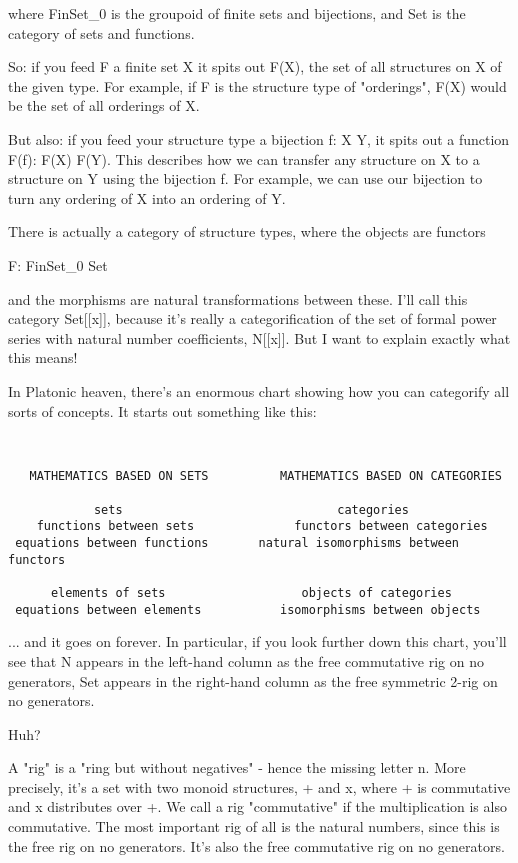 where FinSet_{0} is the groupoid of finite sets and bijections,
and Set is the category of sets and functions.

So: if you feed F a finite set X it spits out F(X), the set of 
all structures on X of the given type.  For example, if F is the
structure type of "orderings", F(X) would be the set of all 
orderings of X.

But also: if you feed your structure type a bijection f: X \to  Y,
it spits out a function F(f): F(X) \to  F(Y).  This describes how
we can transfer any structure on X to a structure on Y using the
bijection f.  For example, we can use our bijection to turn any 
ordering of X into an ordering of Y.

There is actually a category of structure types, where the objects 
are functors 

F: FinSet_{0} \to  Set

and the morphisms are natural transformations between these.   I'll 
call this category Set[[x]], because it's really a categorification of 
the set of formal power series with natural number coefficients, N[[x]]. 
But I want to explain exactly what this means!

In Platonic heaven, there's an enormous chart showing how you can
categorify all sorts of concepts.  It starts out something like this:


\begin{verbatim}


   MATHEMATICS BASED ON SETS          MATHEMATICS BASED ON CATEGORIES

            sets                              categories
    functions between sets              functors between categories
 equations between functions       natural isomorphisms between functors

      elements of sets                   objects of categories
 equations between elements           isomorphisms between objects

\end{verbatim}
    
... and it goes on forever.  In particular, if you look further down
this chart, you'll see that N appears in the left-hand column as the
free commutative rig on no generators, Set appears in the right-hand
column as the free symmetric 2-rig on no generators.

Huh?

A "rig" is a "ring but without negatives" - hence the missing letter n.
More precisely, it's a set with two monoid structures, + and x, where +
is commutative and x distributes over +.   We call a rig "commutative" 
if the multiplication is also commutative.  The most important rig of all
is the natural numbers, since this is the free rig on no generators.
It's also the free commutative rig on no generators.

